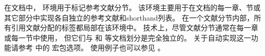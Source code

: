 
在文档中， 环境用于标记参考文献分节。
该环境主要用于在文档的每一章、节或其它部分中实现各自独立的参考文献和shorthand列表。
在一个文献分节内部，所有引用文献分配的标签都局部在该环境中。
技术上，尽管文献分节通常在每一章或每一节中使用，
但它们与  和  等文档划分是完全独立的。
关于自动实现这一功能请参考  中的  宏包选项。
使用例子也可以参见 。


